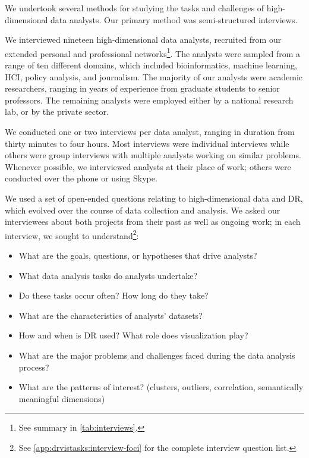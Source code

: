 We undertook several methods for studying the tasks and challenges of high-dimensional data analysts. 
Our primary method was semi-structured interviews. 

We interviewed nineteen high-dimensional data analysts, recruited from our extended personal and professional networks\footnote{See summary in \autoref{tab:interviews}.}.
The analysts were sampled from a range of ten different domains, which included bioinformatics, machine learning, \ac{HCI}, policy analysis, and journalism. 
The majority of our analysts were academic researchers, ranging in years of experience from graduate students to senior professors. 
The remaining analysts were employed either by a national research lab, or by the private sector.

We conducted one or two interviews per data analyst, ranging in duration from thirty minutes to four hours. 
Most interviews were individual interviews while others were group interviews with multiple analysts working on similar problems. 
Whenever possible, we interviewed analysts at their place of work; others were conducted over the phone or using Skype. 

We used a set of open-ended questions relating to high-dimensional data and \ac{DR}, which evolved over the course of data collection and analysis. 
We asked our interviewees about both projects from their past as well as ongoing work; in each interview, we sought to understand\footnote{See \autoref{app:drvistasks:interview-foci} for the complete interview question list.}: 

\begin{itemize}
    \item What are the goals, questions, or hypotheses that drive analysts?
    \item What data analysis tasks do analysts undertake?
    \item Do these tasks occur often? How long do they take? 
    \item What are the characteristics of analysts' datasets?
    \item How and when is \ac{DR} used? What role does visualization play?
    \item What are the major problems and challenges faced during the data analysis process?
    \item What are the patterns of interest? (clusters, outliers, correlation, semantically meaningful dimensions)
\end{itemize}

